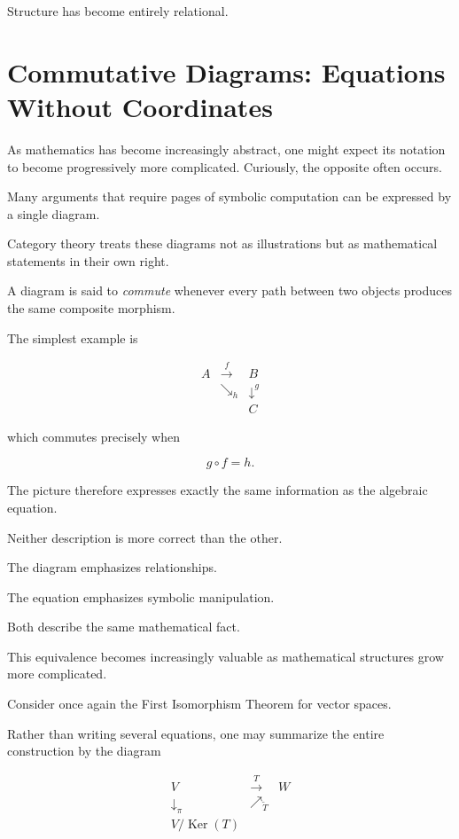 \documentclass[11pt]{book}
\numberwithin{equation}{chapter}
\theoremstyle{definition}
\theoremstyle{plain}
\theoremstyle{remark}
\DeclareMathOperator{\Ker}{Ker}
\begin{document}
Structure has become entirely relational.


\section{Commutative Diagrams: Equations Without Coordinates}

As mathematics has become increasingly abstract, one might expect its notation to become progressively more complicated. Curiously, the opposite often occurs.

Many arguments that require pages of symbolic computation can be expressed by a single diagram.

Category theory treats these diagrams not as illustrations but as mathematical statements in their own right.

A diagram is said to \emph{commute} whenever every path between two objects produces the same composite morphism.

The simplest example is

\[
\begin{array}{ccc}
A & \xrightarrow{\;f\;} & B\\
& \searrow_{h} & \downarrow^{g}\\
& & C
\end{array}
\]

which commutes precisely when

\[
g\circ f=h.
\]

The picture therefore expresses exactly the same information as the algebraic equation.

Neither description is more correct than the other.

The diagram emphasizes relationships.

The equation emphasizes symbolic manipulation.

Both describe the same mathematical fact.

This equivalence becomes increasingly valuable as mathematical structures grow more complicated.

Consider once again the First Isomorphism Theorem for vector spaces.

Rather than writing several equations, one may summarize the entire construction by the diagram

\[
\begin{array}{ccc}
V
&
\xrightarrow{\;T\;}
&
W
\\
\downarrow_{\pi}
&
\nearrow_{\widetilde{T}}
&
\\
V/\Ker(T)
&
&
\end{array}
\]
\end{document}
